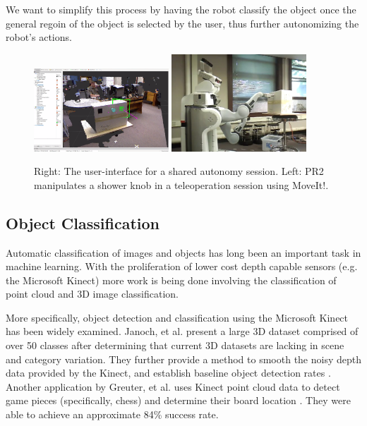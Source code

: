 \documentclass{article}
\begin{document}
We want to simplify this process by having the robot classify the object once the general regoin of the object is selected by the user, thus further autonomizing the robot's actions.

\begin{figure}[h!]
    \centering
    \includegraphics[width=0.45\textwidth]{Shared_Autonomy_1.png}
    \includegraphics[width=0.45\textwidth]{Shared_Autonomy_2.png}
    \caption{Right: The user-interface for a shared autonomy session. Left: PR2 manipulates a shower knob in a teleoperation session using MoveIt!.}
    \label{fig:sharedAutonomy}
\end{figure}

\subsection{Object Classification}
Automatic classification of images and objects has long been an important task in machine learning. With the proliferation of lower cost depth capable sensors (e.g. the Microsoft Kinect) more work is being done involving the classification of point cloud and 3D image classification.

More specifically, object detection and classification using the Microsoft Kinect has been widely examined. Janoch, et al. present a large 3D dataset comprised of over 50 classes after determining that current 3D datasets are lacking in scene and category variation. They further provide a method to smooth the noisy depth data provided by the Kinect, and establish baseline object detection rates \cite{kinectWork}. Another application by Greuter, et al. uses Kinect point cloud data to detect game pieces (specifically, chess) and determine their board location \cite{eurobot}. They were able to achieve an approximate 84\% success rate.
\end{document}
